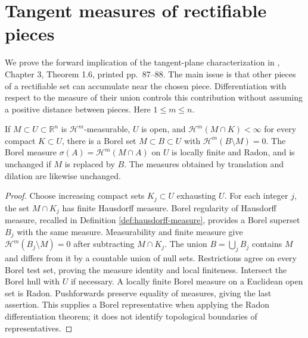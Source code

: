 \chapter{Tangent measures of rectifiable pieces}\label{sec:rectifiable-tangent-transfer}
We prove the forward implication of the tangent-plane characterization in \cite{Sim18}, Chapter 3, Theorem 1.6, printed pp.~87--88. The main issue is that other pieces of a rectifiable set can accumulate near the chosen piece. Differentiation with respect to the measure of their union controls this contribution without assuming a positive distance between pieces. Here $1\leq m\leq n$.

\begin{lemma}\label{lem:rectifiable-borel-representative}
If $M\subset U\subset\mathbb R^n$ is $\mathcal H^m$-measurable, $U$ is open, and $\mathcal H^m(M\cap K)<\infty$ for every compact $K\subset U$, there is a Borel set $M\subset B\subset U$ with $\mathcal H^m(B\setminus M)=0$. The Borel measure $\sigma(A)=\mathcal H^m(M\cap A)$ on $U$ is locally finite and Radon, and is unchanged if $M$ is replaced by $B$. The measures obtained by translation and dilation are likewise unchanged.
\end{lemma}
\begin{proof}
Choose increasing compact sets $K_j\subset U$ exhausting $U$. For each integer $j$, the set $M\cap K_j$ has finite Hausdorff measure. Borel regularity of Hausdorff measure, recalled in Definition \ref{def:hausdorff-measure}, provides a Borel superset $B_j$ with the same measure. Measurability and finite measure give $\mathcal H^m(B_j\setminus M)=0$ after subtracting $M\cap K_j$. The union $B=\bigcup_jB_j$ contains $M$ and differs from it by a countable union of null sets. Restrictions agree on every Borel test set, proving the measure identity and local finiteness. Intersect the Borel hull with $U$ if necessary. A locally finite Borel measure on a Euclidean open set is Radon. Pushforwards preserve equality of measures, giving the last assertion. This supplies a Borel representative when applying the Radon differentiation theorem; it does not identify topological boundaries of representatives.
\end{proof}


